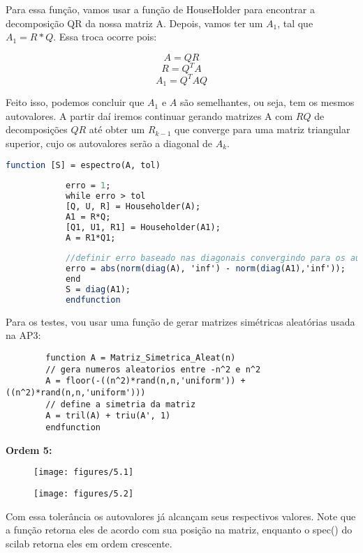 \documentclass[leqno]{article}
\numberwithin{equation}{section}
\begin{document}
	Para essa função, vamos usar a função de HouseHolder para encontrar a decomposição QR da nossa matriz A.
	Depois, vamos ter um $A_1$, tal que $A_1 = R*Q$. Essa troca ocorre pois:
	
	$$A = QR$$
	$$R = Q^T A$$
	$$A_1 = Q^T A Q$$
	
	Feito isso, podemos concluir que $A_1$ e $A$ são semelhantes, ou seja, tem os mesmos autovalores. A partir daí iremos continuar gerando matrizes A com $RQ$ de decomposições $QR$ até obter um $R_{k-1}$ que converge para uma matriz triangular superior, cujo os autovalores serão a diagonal de $A_k$.

	\begin{sol}			
		\begin{lstlisting}[style=mystyle, language=Scilab]
			function [S] = espectro(A, tol)
			
			erro = 1;
			while erro > tol
			[Q, U, R] = Householder(A);
			A1 = R*Q;
			[Q1, U1, R1] = Householder(A1);
			A = R1*Q1;
			
			//definir erro baseado nas diagonais convergindo para os autovalores
			erro = abs(norm(diag(A), 'inf') - norm(diag(A1),'inf'));
			end
			S = diag(A1);
			endfunction
		\end{lstlisting}
	\end{sol}

	Para os testes, vou usar uma função de gerar matrizes simétricas aleatórias usada na AP3:
	
	\begin{lstlisting}
		function A = Matriz_Simetrica_Aleat(n)
		// gera numeros aleatorios entre -n^2 e n^2  
		A = floor(-((n^2)*rand(n,n,'uniform')) + ((n^2)*rand(n,n,'uniform')))
		// define a simetria da matriz
		A = tril(A) + triu(A', 1)
		endfunction
	\end{lstlisting}

	\textbf{{\large Ordem 5:}}
	
	\begin{figure}[H]
		\centering
		\texttt{[image: figures/5.1]}		
	\end{figure}

	\begin{figure}[H]
		\centering
		\texttt{[image: figures/5.2]}		
	\end{figure}

	Com essa tolerância os autovalores já alcançam seus respectivos valores. Note que a função retorna eles de acordo com sua posição na matriz, enquanto o spec() do scilab retorna eles em ordem crescente.\\
\end{document}
